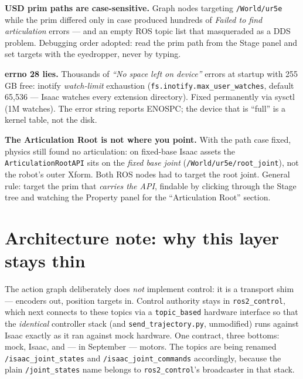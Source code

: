 \begin{lesson}
\textbf{USD prim paths are case-sensitive.} Graph nodes targeting \texttt{/World/ur5e} while
the prim differed only in case produced hundreds of \emph{Failed to find articulation} errors
— and an empty ROS topic list that masqueraded as a DDS problem. Debugging order adopted:
read the prim path from the Stage panel and set targets with the eyedropper, never by typing.
\end{lesson}

\begin{lesson}
\textbf{errno 28 lies.} Thousands of \emph{``No space left on device''} errors at startup with
255\,GB free: inotify \emph{watch-limit} exhaustion (\texttt{fs.inotify.max\_user\_watches},
default 65{,}536 — Isaac watches every extension directory). Fixed permanently via sysctl
(1M watches). The error string reports ENOSPC; the device that is ``full'' is a kernel table,
not the disk.
\end{lesson}

\begin{lesson}
\textbf{The Articulation Root is not where you point.} With the path case fixed, physics still
found no articulation: on fixed-base Isaac assets the \texttt{ArticulationRootAPI} sits on the
\emph{fixed base joint} (\texttt{/World/ur5e/root\_joint}), not the robot's outer Xform. Both
ROS nodes had to target the root joint. General rule: target the prim that \emph{carries the
API}, findable by clicking through the Stage tree and watching the Property panel for the
``Articulation Root'' section.
\end{lesson}

\section{Architecture note: why this layer stays thin}

The action graph deliberately does \emph{not} implement control: it is a transport shim ---
encoders out, position targets in. Control authority stays in \texttt{ros2\_control}, which
next connects to these topics via a \texttt{topic\_based} hardware interface so that the
\emph{identical} controller stack (and \texttt{send\_trajectory.py}, unmodified) runs against
Isaac exactly as it ran against mock hardware. One contract, three bottoms: mock, Isaac,
and --- in September --- motors. The topics are being renamed \texttt{/isaac\_joint\_states}
and \texttt{/isaac\_joint\_commands} accordingly, because the plain \texttt{/joint\_states}
name belongs to \texttt{ros2\_control}'s broadcaster in that stack.
